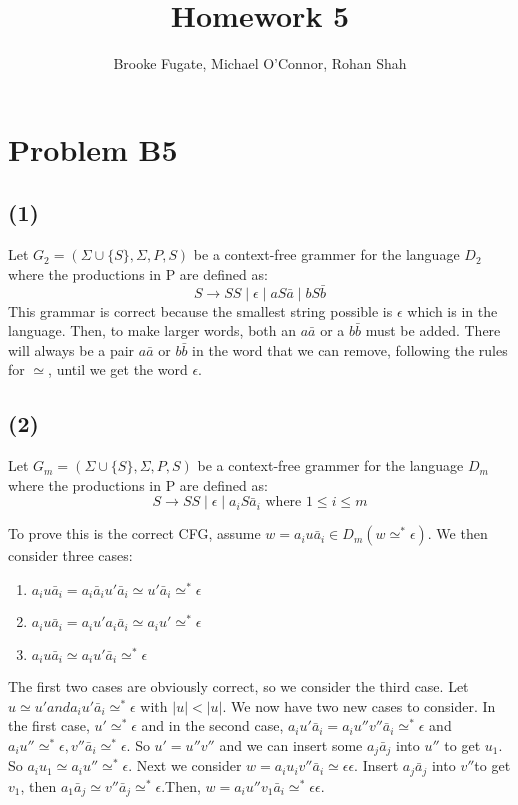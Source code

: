 \documentclass[12pt]{article}
\begin{document}
\pagestyle{plain}
\titleformat{\subsection}[runin]
  {\normalfont\large\bfseries}{\thesubsection}{1em}{}

\title{Homework 5}
\author{Brooke Fugate, Michael O'Connor, Rohan Shah}
\date{}

\maketitle

\section*{Problem B5}
\subsection*{(1)} Let $G_2 = (\Sigma\cup \{S\},\Sigma,P,S)$ be a context-free
grammer for the language $D_2$ where the productions in P are defined as:
$$ S \rightarrow SS \mid \epsilon \mid aS\bar a \mid bS\bar b$$
This grammar is correct because the smallest string possible is $\epsilon$ which is in the language. Then, to make larger words, both an $a \bar a$ or a $b \bar b$ must be added. There will always be a pair $a \bar a$ or $b \bar b$ in the word that we can remove, following the rules for $\simeq$, until we get the word $\epsilon$.

\subsection*{(2)} Let $G_m = (\Sigma\cup \{S\},\Sigma,P,S)$ be a context-free
grammer for the language $D_m$ where the productions in P are defined as:
$$S \rightarrow SS\mid \epsilon \mid a_iS\bar a_i \text{ where } 1\le i\le m$$

To prove this is the correct CFG, assume $w=a_iu \bar a_i \in D_m(w \simeq^{*} \epsilon)$. We then consider three cases: 
\begin{enumerate}
\item $a_iu \bar a_i = a_i \bar a_i u' \bar a_i \simeq u' \bar a_i \simeq^{*} \epsilon$
\item $a_iu \bar a_i = a_i u'a_i \bar a_i \simeq a_iu' \simeq^{*} \epsilon$ 
\item $a_iu \bar a_i \simeq a_i u' \bar a_i \simeq^{*} \epsilon$ 
\end{enumerate}
The first two cases are obviously correct, so we consider the third case.
Let $u \simeq u' and a_iu' \bar a_i \simeq^* \epsilon$ with $|u| < |u|$. We now have two new cases to consider. In the first case, $u' \simeq^{*} \epsilon$ and in the second case, $a_iu' \bar a_i = a_iu''v'' \bar a_i \simeq^{*} \epsilon$ and $a_iu'' \simeq^{*} \epsilon , v'' \bar a_i \simeq^{*} \epsilon$. So $u'=u''v''$ and we can insert some $a_j\bar a_j$ into $u''$ to get $u_1$. So $a_iu_1 \simeq a_iu'' \simeq^* \epsilon$. 
Next we consider $w=a_iu_iv'' \bar a_i \simeq \epsilon \epsilon$.
Insert $a_j \bar a_j$ into $v''$to get $v_1$, then $a_1 \bar a_j \simeq v'' \bar a_j \simeq^* \epsilon$.Then, 
$w=a_iu''v_1 \bar a_i \simeq^* \epsilon \epsilon$. 
\end{document}
